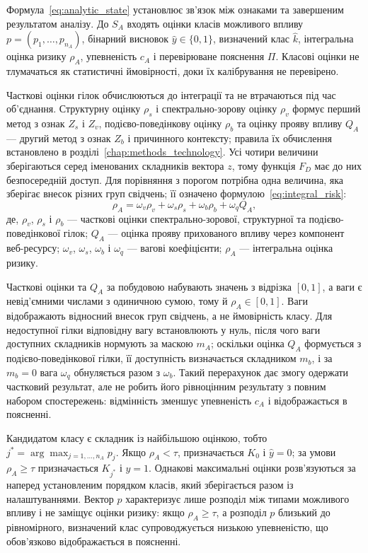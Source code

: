 Формула~\eqref{eq:analytic_state} установлює зв’язок між ознаками та завершеним результатом аналізу. До $S_A$ входять оцінки класів можливого впливу $p=(p_1,\ldots,p_{n_A})$, бінарний висновок $\hat y\in\{0,1\}$, визначений клас $\hat k$, інтегральна оцінка ризику $\rho_A$, упевненість $c_A$ і перевірюване пояснення $\Pi$. Класові оцінки не тлумачаться як статистичні ймовірності, доки їх калібрування не перевірено.

Часткові оцінки гілок обчислюються до інтеграції та не втрачаються під час об’єднання. Структурну оцінку $\rho_s$ і спектрально-зорову оцінку $\rho_v$ формує перший метод з ознак $Z_s$ і $Z_v$, подієво-поведінкову оцінку $\rho_b$ та оцінку прояву впливу $Q_A$ --- другий метод з ознак $Z_b$ і причинного контексту; правила їх обчислення встановлено в розділі~\ref{chap:methods_technology}. Усі чотири величини зберігаються серед іменованих складників вектора $z$, тому функція $F_D$ має до них безпосередній доступ. Для порівняння з порогом потрібна одна величина, яка зберігає внесок різних груп свідчень; її означено формулою~\eqref{eq:integral_risk}:
\begin{equation}
\rho_A=\omega_v\rho_v+\omega_s\rho_s+\omega_b\rho_b+\omega_q Q_A,
\label{eq:integral_risk}
\end{equation}
де, $\rho_v$, $\rho_s$ і $\rho_b$ --- часткові оцінки спектрально-зорової, структурної та подієво-поведінкової гілок; $Q_A$ --- оцінка прояву прихованого впливу через компонент веб-ресурсу; $\omega_v$, $\omega_s$, $\omega_b$ і $\omega_q$ --- вагові коефіцієнти; $\rho_A$ --- інтегральна оцінка ризику.

Часткові оцінки та $Q_A$ за побудовою набувають значень з відрізка $[0,1]$, а ваги є невід’ємними числами з одиничною сумою, тому й $\rho_A\in[0,1]$. Ваги відображають відносний внесок груп свідчень, а не ймовірність класу. Для недоступної гілки відповідну вагу встановлюють у нуль, після чого ваги доступних складників нормують за маскою $m_A$; оскільки оцінка $Q_A$ формується з подієво-поведінкової гілки, її доступність визначається складником $m_b$, і за $m_b=0$ вага $\omega_q$ обнуляється разом з $\omega_b$. Такий перерахунок дає змогу одержати частковий результат, але не робить його рівноцінним результату з повним набором спостережень: відмінність зменшує упевненість $c_A$ і відображається в поясненні.

Кандидатом класу є складник із найбільшою оцінкою, тобто $j^{*}=\arg\max_{j=1,\ldots,n_A}p_j$. Якщо $\rho_A<\tau$, призначається $K_0$ і $\hat y=0$; за умови $\rho_A\geq\tau$ призначається $K_{j^{*}}$ і $\hat y=1$. Однакові максимальні оцінки розв’язуються за наперед установленим порядком класів, який зберігається разом із налаштуваннями. Вектор $p$ характеризує лише розподіл між типами можливого впливу і не заміщує оцінки ризику: якщо $\rho_A\geq\tau$, а розподіл $p$ близький до рівномірного, визначений клас супроводжується низькою упевненістю, що обов’язково відображається в поясненні.


